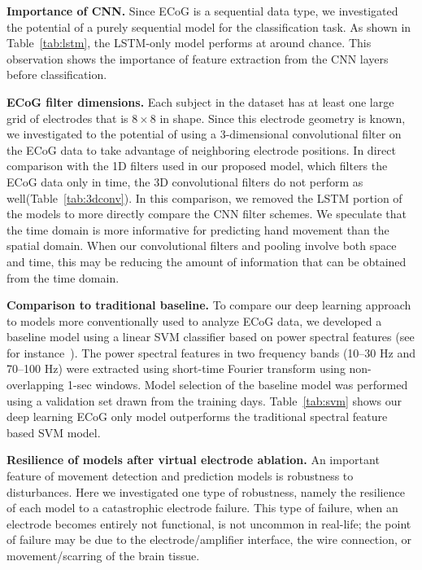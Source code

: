 \documentclass[letterpaper]{article} %
\begin{document}
\textbf{Importance of CNN.} Since ECoG is a sequential data type, we investigated the potential of a purely sequential model for the classification task. 
As shown in Table~\ref{tab:lstm}, the LSTM-only model performs at around chance. 
This observation shows the importance of feature extraction from the CNN layers before classification. 


\textbf{ECoG filter dimensions.} Each subject in the dataset has at least one large grid of electrodes that is $8\times8$ in shape. 
Since this electrode geometry is known, we investigated to the potential of using a 3-dimensional convolutional filter on the ECoG data to take advantage of neighboring electrode positions.
In direct comparison with the 1D filters used in our proposed model, which filters the ECoG data only in time, the 3D convolutional filters do not perform as well(Table~\ref{tab:3dconv}).
In this comparison, we removed the LSTM portion of the models to more directly compare the CNN filter schemes. 
We speculate that the time domain is more informative for predicting hand movement than the spatial domain. 
When our convolutional filters and pooling involve both space and time, this may be reducing the amount of information that can be obtained from the time domain. 

\textbf{Comparison to traditional baseline.} To compare our deep learning approach to models more conventionally used to analyze ECoG data, we developed a baseline model using a linear SVM classifier based on power spectral features (see for instance~\cite{shenoy2008,Yanagisawa2011}).
The power spectral features in two frequency bands (10--30 Hz and 70--100 Hz) were extracted using short-time Fourier transform using non-overlapping 1-sec windows. 
Model selection of the baseline model was performed using a validation set drawn from the training days. 
Table~\ref{tab:svm} shows our deep learning ECoG only model outperforms the traditional spectral feature based SVM model. 


\textbf{Resilience of models after virtual electrode ablation.} An important feature of movement detection and prediction models is robustness to disturbances. Here we investigated one type of robustness, namely the resilience of each model to a catastrophic electrode failure. This type of failure, when an electrode becomes entirely not functional, is not uncommon in real-life; the point of failure may be due to the electrode/amplifier interface, the wire connection, or movement/scarring of the brain tissue.
\end{document}

